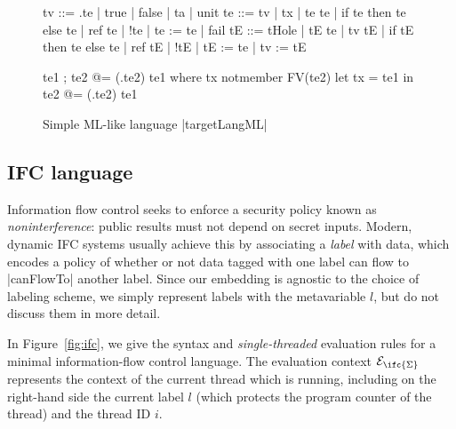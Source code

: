 \begin{figure}
\begin{code}
tv   ::= \tx.te | true | false | ta | unit
te   ::= tv | tx | te te | if te then te else te | ref te | !te | te := te | fail
tE   ::= tHole | tE te | tv tE | if tE then te else te
       | ref tE | !tE | tE := te | tv := tE 

te1 ; te2            @= (\tx.te2) te1  where  tx notmember FV(te2)
let tx = te1 in te2  @= (\tx.te2) te1
\end{code}


\caption{Simple ML-like language |targetLangML|}
\label{fig:ml}
\end{figure}

\subsection{IFC language}

Information flow control seeks to enforce a security policy known as
\emph{noninterference}: public results must not depend on secret inputs.
Modern, dynamic IFC systems usually achieve this by associating a \emph{label}
with data, which encodes a policy of whether or not data tagged with one
label can flow to |canFlowTo| another label.  Since our embedding is agnostic
to the choice of labeling scheme, we simply represent labels with the metavariable
$l$, but do not discuss them in more detail.

In Figure~\ref{fig:ifc}, we give the syntax and \emph{single-threaded}
evaluation rules for a minimal information-flow control language.  The
evaluation context $\mathcal{E}_{\ifc{\Sigma}}$ represents the context
of the current thread which is running, including on the right-hand side
the current label $l$ (which protects the program counter of the thread)
and the thread ID $i$.


